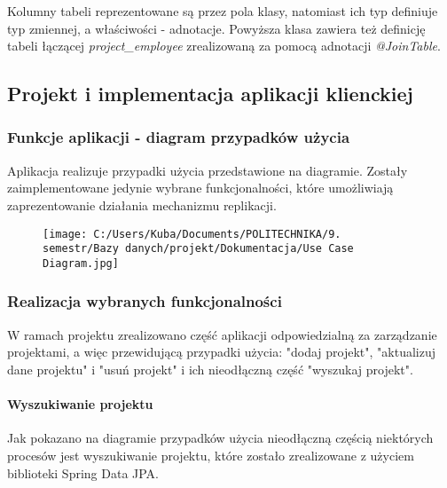 \documentclass[]{article}
\let\oldparagraph\paragraph
\renewcommand{\paragraph}[1]{\oldparagraph{#1}\mbox{}}
\begin{document}
Kolumny tabeli reprezentowane są przez pola klasy, natomiast ich typ
definiuje typ zmiennej, a właściwości - adnotacje. Powyższa klasa
zawiera też definicję tabeli łączącej \emph{project\_employee}
zrealizowaną za pomocą adnotacji \emph{@JoinTable}.

\hypertarget{header-n109}{%
\subsection{Projekt i implementacja aplikacji
klienckiej}\label{header-n109}}

\hypertarget{header-n110}{%
\subsubsection{Funkcje aplikacji - diagram przypadków
użycia}\label{header-n110}}

Aplikacja realizuje przypadki użycia przedstawione na diagramie. Zostały
zaimplementowane jedynie wybrane funkcjonalności, które umożliwiają
zaprezentowanie działania mechanizmu replikacji.

\begin{figure}
\centering
\texttt{[image: C:/Users/Kuba/Documents/POLITECHNIKA/9. semestr/Bazy danych/projekt/Dokumentacja/Use Case Diagram.jpg]}
\caption{}
\end{figure}

\hypertarget{header-n115}{%
\subsubsection{Realizacja wybranych funkcjonalności}\label{header-n115}}

W ramach projektu zrealizowano część aplikacji odpowiedzialną za
zarządzanie projektami, a więc przewidującą przypadki użycia: "dodaj
projekt", "aktualizuj dane projektu" i "usuń projekt" i ich nieodłączną
część "wyszukaj projekt".

\hypertarget{header-n118}{%
\paragraph{Wyszukiwanie projektu}\label{header-n118}}

Jak pokazano na diagramie przypadków użycia nieodłączną częścią
niektórych procesów jest wyszukiwanie projektu, które zostało
zrealizowane z użyciem biblioteki Spring Data JPA.
\end{document}
